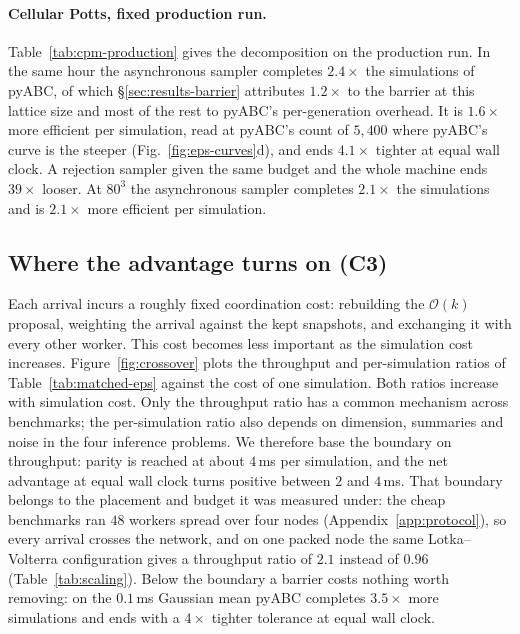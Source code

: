 \documentclass[10pt]{article}
\theoremstyle{plain}
\theoremstyle{definition}
\begin{document}
\paragraph{Cellular Potts, fixed production run.} Table~\ref{tab:cpm-production} gives the decomposition on the production run. In the same hour the asynchronous sampler completes $2.4\times$ the simulations of pyABC, of which \S\ref{sec:results-barrier} attributes $1.2\times$ to the barrier at this lattice size and most of the rest to pyABC's per-generation overhead. It is $1.6\times$ more efficient per simulation, read at pyABC's count of $5{,}400$ where pyABC's curve is the steeper (Fig.~\ref{fig:eps-curves}d), and ends $4.1\times$ tighter at equal wall clock. A rejection sampler given the same budget and the whole machine ends $39\times$ looser. At $80^3$ the asynchronous sampler completes $2.1\times$ the simulations and is $2.1\times$ more efficient per simulation.
\subsection{Where the advantage turns on (C3)}\label{sec:results-boundary}

Each arrival incurs a roughly fixed coordination cost: rebuilding the $\mathcal{O}(k)$ proposal, weighting the arrival against the kept snapshots, and exchanging it with every other worker. This cost becomes less important as the simulation cost increases. Figure~\ref{fig:crossover} plots the throughput and per-simulation ratios of Table~\ref{tab:matched-eps} against the cost of one simulation. Both ratios increase with simulation cost. Only the throughput ratio has a common mechanism across benchmarks; the per-simulation ratio also depends on dimension, summaries and noise in the four inference problems. We therefore base the boundary on throughput: parity is reached at about $4$\,ms per simulation, and the net advantage at equal wall clock turns positive between $2$ and $4$\,ms. That boundary belongs to the placement and budget it was measured under: the cheap benchmarks ran $48$ workers spread over four nodes (Appendix~\ref{app:protocol}), so every arrival crosses the network, and on one packed node the same Lotka--Volterra configuration gives a throughput ratio of $2.1$ instead of $0.96$ (Table~\ref{tab:scaling}). Below the boundary a barrier costs nothing worth removing: on the $0.1$\,ms Gaussian mean pyABC completes $3.5\times$ more simulations and ends with a $4\times$ tighter tolerance at equal wall clock.
\end{document}
